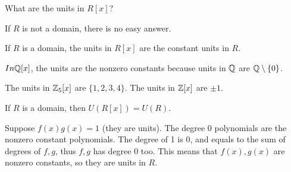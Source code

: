 \documentclass[class=article,crop=false]{standalone}
\begin{document}
What are the units in $ R[x]$? 

If  $ R$ is not a domain, there is no easy answer.

If  $ R$ is a domain, the units in  $ R[x]$ are the constant units in  $ R$.

 \begin{eg}[]
	 $In \mathbb{Q}[x]$, the units are the nonzero constants because units in $ \mathbb{Q} $ are $ \mathbb{Q} \setminus \{0\} $.
\end{eg}
\begin{eg}[]
	The units in $ \mathbb{Z}_5[x]$ are $ \{1,2,3,4\} $. The units in $ \mathbb{Z}[x]$ are $ \pm 1$.
\end{eg}

\begin{thm}[]
	If $ R$ is a domain, then  $ U(R[x])=U(R)$.
\end{thm}

\begin{prf}
	Suppose $ f(x)g(x)=1$ (they are units). The degree 0 polynomials are the nonzero constant polynomials. The degree of 1 is 0, and equals to the sum of degrees of  $ f,g$, thus  $ f,g$ has degree 0 too. This means that  $ f(x),g(x)$ are nonzero constants, so they are units in  $ R$.
\end{prf}
\end{document}
